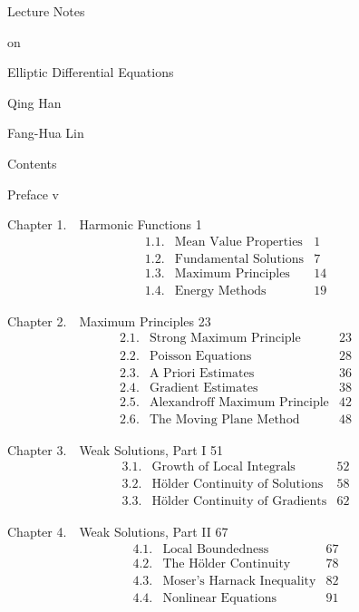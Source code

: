 \begin{center}
Lecture Notes

on

Elliptic Differential Equations

Qing Han

Fang-Hua Lin
\end{center}

\begin{center}
Contents
\end{center}

Preface \hfill v

Chapter 1.\ \ Harmonic Functions \hfill 1
\[
\begin{array}{llr}
1.1.&\text{Mean Value Properties}&1\\
1.2.&\text{Fundamental Solutions}&7\\
1.3.&\text{Maximum Principles}&14\\
1.4.&\text{Energy Methods}&19
\end{array}
\]

Chapter 2.\ \ Maximum Principles \hfill 23
\[
\begin{array}{llr}
2.1.&\text{Strong Maximum Principle}&23\\
2.2.&\text{Poisson Equations}&28\\
2.3.&\text{A Priori Estimates}&36\\
2.4.&\text{Gradient Estimates}&38\\
2.5.&\text{Alexandroff Maximum Principle}&42\\
2.6.&\text{The Moving Plane Method}&48
\end{array}
\]

Chapter 3.\ \ Weak Solutions, Part I \hfill 51
\[
\begin{array}{llr}
3.1.&\text{Growth of Local Integrals}&52\\
3.2.&\text{H\"older Continuity of Solutions}&58\\
3.3.&\text{H\"older Continuity of Gradients}&62
\end{array}
\]

Chapter 4.\ \ Weak Solutions, Part II \hfill 67
\[
\begin{array}{llr}
4.1.&\text{Local Boundedness}&67\\
4.2.&\text{The H\"older Continuity}&78\\
4.3.&\text{Moser's Harnack Inequality}&82\\
4.4.&\text{Nonlinear Equations}&91
\end{array}
\]

